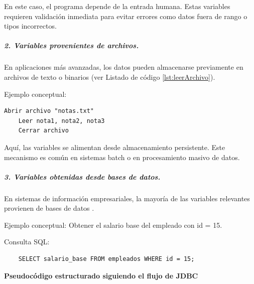 \documentclass[12pt,twoside]{book}
\begin{document}
					\noindent
					En este caso, el programa depende de la entrada humana. Estas variables requieren validación inmediata para evitar errores como datos fuera de rango o tipos incorrectos.
					
					\subparagraph{2. Variables provenientes de archivos.} En aplicaciones más avanzadas, los datos pueden almacenarse previamente en archivos de texto o binarios (ver Listado de código \ref{lst:leerArchivo}).
					
					Ejemplo conceptual:
					
					\begin{lstlisting}[style=upsamStyle,caption={Pseudocódigo: Variables leídas desde un archivo.},label={lst:leerArchivo},basicstyle=\small\ttfamily]
	Abrir archivo "notas.txt"
	Leer nota1, nota2, nota3
	Cerrar archivo \end{lstlisting}
					
					\noindent
					Aquí, las variables se alimentan desde almacenamiento persistente. Este mecanismo es común en sistemas batch o en procesamiento masivo de datos.
					
					\subparagraph{3. Variables obtenidas desde bases de datos.} En sistemas de información empresariales, la mayoría de las variables relevantes provienen de bases de datos \cite{Silberschatz2020Database,Elmasri2016Database}. 
					
					Ejemplo conceptual: Obtener el salario base del empleado con id = 15.
					
					Consulta SQL:
					\begin{verbatim}
	SELECT salario_base FROM empleados WHERE id = 15;
					\end{verbatim}
					
					\noindent
					\textbf{Pseudocódigo estructurado siguiendo el flujo de JDBC}
					
\end{document}
